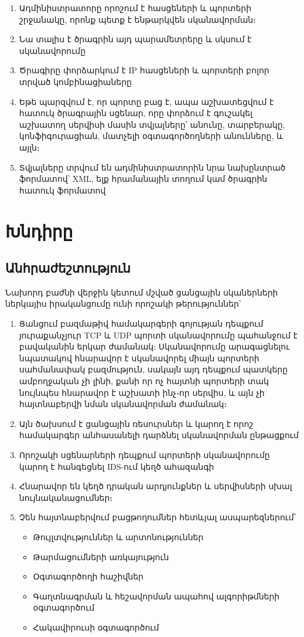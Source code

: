 \documentclass[a4paper,12pt]{article}
\begin{document}
\begin{sloppypar}
\begin{enumerate}
	\begin{enumerate}
	\item Ադմինիստրատորը որոշում է հասցեների և պորտերի շրջանակը, որոնք պետք է
		ենթարկվեն սկանավորման։
	\item Նա տալիս է ծրագրին այդ պարամետրերը և սկսում է սկանավորումը
	\item Ծրագիրը փորձարկում է IP հասցեների և պորտերի բոլոր տրված
		կոմբինացիաները
	\item Եթե պարզվում է, որ պորտը բաց է, ապա աշխատեցվում է հատուկ ծրագրային
		սցենար, որը փորձում է գուշակել աշխատող սերվիսի մասին տվյալները՝
		անունը, տարբերակը, կոնֆիգուրացիան, մատչելի օգտագործողների անունները,
		և այլն։
	\item Տվյալները տրվում են ադմինիստրատորին նրա նախընտրած ֆորմատով՝
		XML, ելք հրամանային տողում կամ ծրագրին հատուկ ֆորմատով
	\end{enumerate}
\end{enumerate}


\section{Խնդիրը}


\subsection{Անհրաժեշտություն}


Նախորդ բաժնի վերջին կետում մշված ցանցային սկաներների ներկայիս իրականցումը
ունի որոշակի թերություններ՝

\begin{enumerate}
\item Ցանցում բազմաթիվ համակարգերի գոյության դեպքում յուրաքանչյուր TCP և
	UDP պորտի սկանավորումը պահանջում է բավականին երկար ժամանակ:
	Սկանավորումը արագացնելու նպատակով հնարավոր է սկանավորել միայն
	պորտերի սահմանափակ բազմություն, սակայն այդ դեպքում պատկերը ամբողջական
	չի լինի, քանի որ ոչ հայտնի պորտերի տակ նույնպես հնարավոր է աշխատի
	ինչ֊որ սերվիս, և այն չի հայտնաբերվի նման սկանավորման ժամանակ։
\item Այն ծախսում է ցանցային ռեսուրսներ և կարող է որոշ համակարգեր
    անհասանելի դարձնել սկանավորման ընթացքում
\item Որոշակի սցենարների դեպքում պորտերի սկանավորումը կարող է
    հանգեցնել IDS-ում կեղծ ահազանգի
\item Հնարավոր են կեղծ դրական արդյունքներ և սերվիսների սխալ
	նույնականացումներ։
\item Չեն հայտնաբերվում բացթողումներ հետևյալ ասպարեզներում՝
	\begin{itemize}
	\item Թույլտվություններ և արտոնություններ
	\item Թարմացումների առկայություն
	\item Օգտագործողի հաշիվներ
	\item Գաղտնագրման և հեշավորման ապահով ալգորիթմների օգտագործում
	\item Հակավիրուսի օգտագործում
	\end{itemize}
\end{enumerate}


\end{sloppypar}
\end{document}
